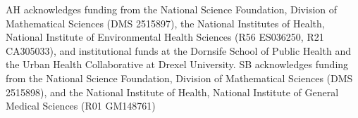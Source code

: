 AH acknowledges funding from the National Science Foundation, Division of Mathematical Sciences (DMS 2515897), the National Institutes of Health, National Institute of Environmental Health Sciences (R56 ES036250, R21 CA305033), and institutional funds at the Dornsife School of Public Health and the Urban Health Collaborative at Drexel University. SB acknowledges funding from the National Science Foundation, Division of Mathematical Sciences (DMS 2515898), and the National Institute of Health, National Institute of General Medical Sciences (R01 GM148761)



\address{Aritra Halder\\
  Department of Biostatistics \& Epidemiology\\
  3215 Market Street, Philadelphia, PA 19104\\
  https://orcid.org/0000-0002-5139-3620\\
  }

\address{Sudipto Banerjee\\
  Department of Biostatistics\\
  University of California, Los Angeles\\
  650 Charles E. Young Drive South, Los Angeles, CA 90095\\
  https://orcid.org/0000-0002-2239-208X\\
  }

